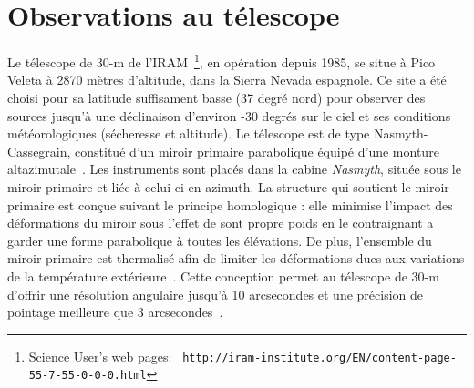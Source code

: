 \section{Observations au télescope}
\label{se:observations}

Le télescope de 30-m de l'IRAM~\footnote{Science User's web pages: {\tt
  http://iram-institute.org/EN/content-page-55-7-55-0-0-0.html}}, en
opération depuis 1985, se situe à Pico Veleta
à 2870 mètres d'altitude, dans la Sierra Nevada espagnole. Ce site a
été choisi pour sa latitude suffisament basse (37 degré nord) pour
observer des sources jusqu'à une déclinaison d'environ -30
degrés sur le ciel et ses conditions météorologiques (sécheresse et
altitude). Le télescope est de type Nasmyth-Cassegrain, constitué d'un
miroir primaire parabolique équipé d'une monture
altazimutale~\citep{Baars1987}. Les instruments sont placés dans la
cabine \emph{Nasmyth}, située sous le miroir primaire et liée à
celui-ci en azimuth. La structure qui soutient le miroir primaire est conçue
suivant le principe homologique : elle minimise l'impact des
déformations du miroir sous l'effet de sont propre poids en le
contraignant a garder une forme parabolique à toutes les
élévations. De plus, l'ensemble du miroir primaire est thermalisé afin
de limiter les déformations dues aux variations de la température
extérieure~\citep{Baars1988}. Cette conception permet au télescope de
30-m d'offrir une résolution angulaire jusqu'à 10 arcsecondes et une
précision de pointage meilleure que 3 arcsecondes~\citep{Greve1996}.  


